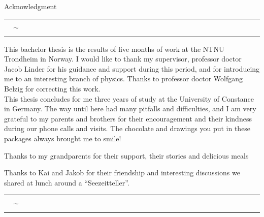 \documentclass[../main.tex]{subfile}
\begin{document}
\thispagestyle{empty}
\vspace*{24pt}
\begin{center}
    \LARGE Acknowledgment \normalsize\vspace{24pt}\\
    \rule[3pt]{0.04\textwidth}{0.2pt} $\quad\sim\quad$\rule[3pt]{.04\textwidth}{0.2pt} 
\end{center}
\vspace*{36pt}


This bachelor thesis is the results of five months of work at the NTNU Trondheim in Norway. I would like to thank my supervisor, professor doctor Jacob Linder
for his guidance and support during this period, and for introducing me to an interesting branch of physics. Thanks to professor doctor Wolfgang Belzig for 
correcting this work.\\

This thesis concludes for me three years of study at the University of Constance in Germany. The way until here had many pitfalls and difficulties, and I am very grateful to my
parents and brothers for their encouragement and their kindness during our phone calls and visits. The chocolate and drawings you put in these packages
always brought me to smile!

Thanks to my grandparents for their support, their stories and delicious meals

Thanks to Kai and Jakob for their friendship and interesting discussions we shared at lunch around a ``Seezeitteller''.
\begin{center}
    \rule{0.1\textwidth}{0.2pt} $\quad\sim\quad$\rule{0.1\textwidth}{0.2pt} 
\end{center}
\end{document}
